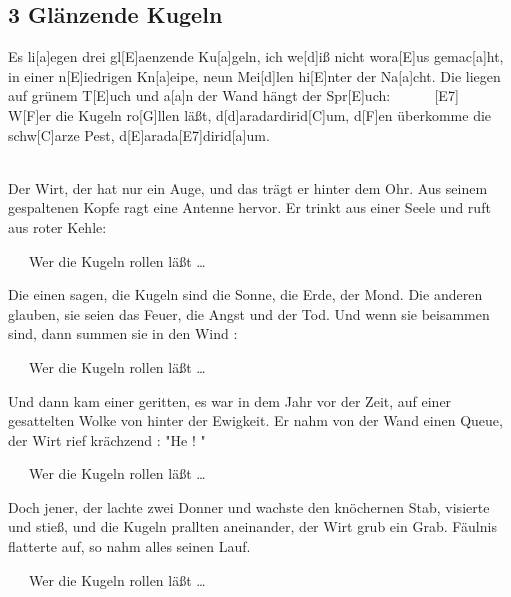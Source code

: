 \documentclass[10pt,a5paper,twoside]{scrbook}
\begin{document}
  	
  	  
\newpage  

\subsection{3 Glänzende Kugeln}
\begin{guitar}
Es li[a]egen drei gl[E]aenzende Ku[a]geln, ich we[d]iß nicht wora[E]us gemac[a]ht,
in einer n[E]iedrigen Kn[a]eipe, neun Mei[d]len hi[E]nter der Na[a]cht.
Die liegen auf grünem T[E]uch und a[a]n der Wand hängt der Spr[E]uch:   ~~~~~  [E7]
\\

  W[F]er die Kugeln ro[G]llen läßt, d[d]aradardirid[C]um,
  d[F]en überkomme die schw[C]arze Pest, d[E]arada[E7]dirid[a]um.

\\
Der Wirt, der hat nur ein Auge, und das trägt er hinter dem Ohr.
Aus seinem gespaltenen Kopfe ragt eine Antenne hervor.
Er trinkt aus einer Seele und ruft aus roter Kehle:

~~~Wer die Kugeln rollen läßt \ldots

Die einen sagen, die Kugeln sind die Sonne, die Erde, der Mond.
Die anderen glauben, sie seien das Feuer, die Angst und der Tod. 
Und wenn sie beisammen sind, dann summen sie in den Wind :

~~~Wer die Kugeln rollen läßt \ldots

Und dann kam einer geritten, es war in dem Jahr vor der Zeit,
auf einer gesattelten Wolke von hinter der Ewigkeit.
Er nahm von der Wand einen Queue, der Wirt rief krächzend : "He ! "

~~~Wer die Kugeln rollen läßt \ldots

Doch jener, der lachte zwei Donner und wachste den knöchernen Stab, 
visierte und stieß, und die Kugeln prallten aneinander, der Wirt grub ein Grab. 
Fäulnis flatterte auf, so nahm alles seinen Lauf.

~~~Wer die Kugeln rollen läßt \ldots
\end{guitar}
  	  

\newpage  

  	
\end{document}
